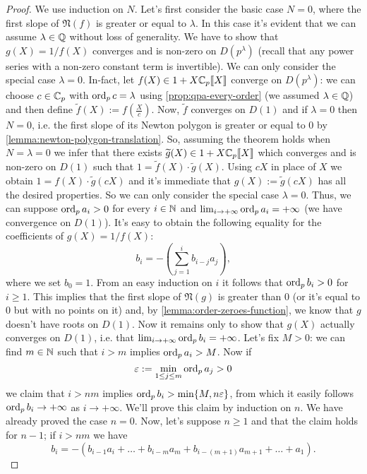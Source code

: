 		\begin{proof}
			We use induction on $N$. Let's first consider the basic case $N = 0$, where the first slope of $\mathfrak{N}(f)$ is greater or equal to $\lambda$. In this case it's evident that we can assume $\lambda \in \mathbb{Q}$ without loss of generality. We have to show that $g(X) = 1/f(X)$ converges and is non-zero on $D(p^{\lambda})$ (recall that any power series with a non-zero constant term is invertible). We can only consider the special case $\lambda = 0$. In-fact, let $f(X) \in 1 + X\mathbb{C}_p\llbracket {X} \rrbracket$ converge on $D(p^{\lambda})$: we can choose $c \in \mathbb{C}_p$ with $\textrm{ord}_p\, c = \lambda$ using \cref{prop:qpa-every-order} (we assumed $\lambda \in \mathbb{Q}$) and then define $\tilde{f}(X) := f\left(\tfrac{X}{c}\right)$. Now, $\tilde{f}$ converges on $D(1)$ and if $\lambda = 0$ then $N = 0$, i.e. the first slope of its Newton polygon is greater or equal to $0$ by \cref{lemma:newton-polygon-translation}. So, assuming the theorem holds when $N = \lambda = 0$ we infer that there exists $\widetilde{g}(X) \in 1 + X\mathbb{C}_p\llbracket {X} \rrbracket$ which converges and is non-zero on $D(1)$ such that $1 = \tilde{f}(X)\cdot\tilde{g}(X)$. Using $cX$ in place of $X$ we obtain $1 =f(X) \cdot \tilde{g}(cX)$ and it's immediate that $g(X) := \tilde{g}(cX)$ has all the desired properties. So we can only consider the special case $\lambda = 0$. Thus, we can suppose $\textrm{ord}_p\, a_i > 0$ for every $i \in \mathbb{N}$ and $\lim_{i \to +\infty} \textrm{ord}_p\, a_i = +\infty$ (we have convergence on $D(1)$). It's easy to obtain the following equality for the coefficients of $g(X) = 1/f(X)$:
			\[
				b_i = -\left(\sum_{j=1}^i b_{i-j}a_j \right),
			\]
			where we set $b_0 = 1$. From an easy induction on $i$ it follows that $\textrm{ord}_p\, b_i > 0$ for $i \geq 1$. This implies that the first slope of $\mathfrak{N}(g)$ is greater than $0$ (or it's equal to $0$ but with no points on it) and, by \cref{lemma:order-zeroes-function}, we know that $g$ doesn't have roots on $D(1)$. Now it remains only to show that $g(X)$ actually converges on $D(1)$, i.e. that $\lim_{i \to +\infty} \textrm{ord}_p\, b_i = +\infty$. Let's fix $M > 0$: we can find $m \in \mathbb{N}$ such that $i > m$ implies $\textrm{ord}_p\, a_i > M$. Now if
			\[
				\varepsilon := \min_{1 \leq j \leq m} \textrm{ord}_p\, a_j> 0
			\]
			we claim that $i > nm$ implies $\textrm{ord}_p\, b_i > \min\{M, n\varepsilon\}$, from which it easily follows $\textrm{ord}_p\, b_i \to +\infty$ as $i \to +\infty$. We'll prove this claim by induction on $n$. We have already proved the case $n = 0$. Now, let's suppose $n \geq 1$ and that the claim holds for $n - 1$; if $i > nm$ we have
			\[
				b_i = -\left(b_{i-1}a_i + \dots + b_{i-m}a_m + b_{i-(m+1)}a_{m+1} + \dots + a_1 \right).
\]
\end{proof}
